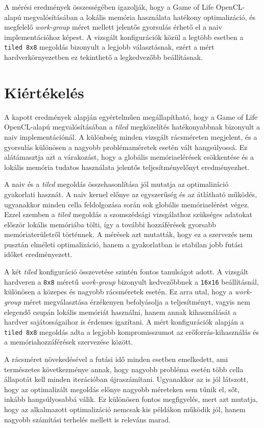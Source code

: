 \documentclass[12pt,a4paper]{article}
\begin{document}
A mérési eredmények összességében igazolják, hogy a Game of Life OpenCL-alapú megvalósításában a lokális memória használata hatékony optimalizáció, és megfelelő \emph{work-group} méret mellett jelentős gyorsulás érhető el a naiv implementációhoz képest. A vizsgált konfigurációk közül a legtöbb esetben a \texttt{tiled 8x8} megoldás bizonyult a legjobb választásnak, ezért a mért hardverkörnyezetben ez tekinthető a legkedvezőbb beállításnak.

\section{Kiértékelés}

A kapott eredmények alapján egyértelműen megállapítható, hogy a Game of Life OpenCL-alapú megvalósításában a \emph{tiled} megközelítés hatékonyabbnak bizonyult a naiv implementációnál. A különbség minden vizsgált rácsméreten megjelent, és a gyorsulás különösen a nagyobb problémaméretek esetén vált hangsúlyossá. Ez alátámasztja azt a várakozást, hogy a globális memóriaelérések csökkentése és a lokális memória tudatos használata jelentős teljesítményelőnyt eredményezhet.

A naiv és a \emph{tiled} megoldás összehasonlítása jól mutatja az optimalizáció gyakorlati hasznát. A naiv kernel előnye az egyszerűség és az átlátható működés, ugyanakkor minden cella feldolgozása során sok globális memóriaelérést végez. Ezzel szemben a \emph{tiled} megoldás a szomszédsági vizsgálathoz szükséges adatokat először lokális memóriába tölti, így a további hozzáférések gyorsabb memóriaterületről történnek. A mérések azt mutatták, hogy ez a szervezés nem pusztán elméleti optimalizáció, hanem a gyakorlatban is stabilan jobb futási időket eredményezett.

A két \emph{tiled} konfiguráció összevetése szintén fontos tanulságot adott. A vizsgált hardveren a \texttt{8x8} méretű \emph{work-group} bizonyult kedvezőbbnek a \texttt{16x16} beállításnál, különösen a közepes és nagyobb rácsméretek esetén. Ez arra utal, hogy a \emph{work-group} méret megválasztása érzékenyen befolyásolja a teljesítményt, vagyis nem elegendő csupán lokális memóriát használni, hanem annak kihasználását a hardver sajátosságaihoz is érdemes igazítani. A mért konfigurációk alapján a \texttt{tiled 8x8} megoldás adta a legjobb kompromisszumot az erőforrás-kihasználás és a memóriahozzáférések szervezése között.

A rácsméret növekedésével a futási idő minden esetben emelkedett, ami természetes következménye annak, hogy nagyobb probléma esetén több cella állapotát kell minden iterációban újraszámítani. Ugyanakkor az is jól látszott, hogy az optimalizált megoldás előnye nagyobb méreteken sem tűnik el, sőt, inkább hangsúlyosabbá válik. Ez különösen fontos megfigyelés, mert azt mutatja, hogy az alkalmazott optimalizáció nemcsak kis példákon működik jól, hanem nagyobb számítási terhelés mellett is releváns marad.
\end{document}
